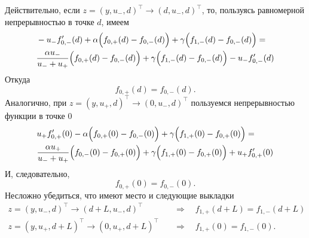\documentclass[12pt,a4paper]{article}
\begin{document}
Действительно, если $z = \left( y, u_- , d\right)^\intercal \to \left( d, u_- , d\right)^\intercal$, то, пользуясь равномерной непрерывностью в точке $d$, имеем
\begin{equation*}
    \begin{aligned}
        &-u_- f_{0,-}' (d) + \alpha \Bigl(f_{0,+}(d) - f_{0,-}(d) \Bigr) + \gamma \Bigl(f_{1,-} (d) - f_{0,-} (d) \Bigr) = \\
        &\frac{\alpha u_-}{u_- + u_+} \Bigl(f_{0,+} (d) - f_{0,-} (d)\Bigr) + \gamma \Bigl( f_{1,-} (d) - f_{0,-} (d) \Bigr) - u_- f_{0,-}' (d)
    \end{aligned}
\end{equation*}
Откуда
$$f_{0, +}(d) = f_{0, -}(d).$$
Аналогично, при $z = \left( y, u_+ , d\right)^\intercal \to \left( 0, u_- , d\right)^\intercal$ пользуемся непрерывностью функции в точке $0$
\begin{equation*}
    \begin{aligned}
        &u_+ f_{0,+}' (0) - \alpha \Bigl(f_{0,+}(0) - f_{0,-}(0) \Bigr) + \gamma \Bigl(f_{1,+} (0) - f_{0,+} (0) \Bigr) = \\
        &\frac{\alpha u_+}{u_- + u_+} \Bigl(f_{0,-} (0) - f_{0,+} (0)\Bigr) + \gamma \Bigl( f_{1,+} (0) - f_{0,+} (0) \Bigr) + u_+ f_{0,+}' (0)
    \end{aligned}
\end{equation*}
И, следовательно,
$$f_{0, +}(0) = f_{0, -}(0).$$
Несложно убедиться, что имеют место и следующие выкладки
\begin{equation*}
    \begin{aligned}
        z = \left( y, u_- , d\right)^\intercal \to \left( d + L, u_- , d\right)^\intercal \quad &\Rightarrow \quad f_{1, +}(d + L) = f_{1, -}(d + L) \\
        z = \left( y, u_+ , d + L\right)^\intercal \to \left( 0, u_+ , d + L\right)^\intercal \quad &\Rightarrow \quad f_{1, +}(0) = f_{1, -}(0).
    \end{aligned}
\end{equation*}
\end{document}
